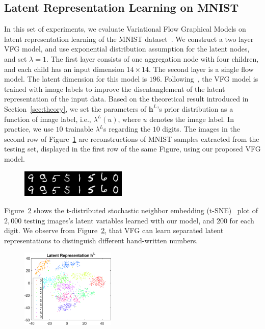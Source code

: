 \documentclass[twoside]{article}
\begin{document}
\subsection{Latent Representation Learning on MNIST}
\vspace{-0.05in}
In this set of experiments, we evaluate  Variational Flow Graphical Models on latent representation learning of the MNIST dataset~\cite{lecun-mnisthandwrittendigit-2010}. 
We construct a two layer VFG model, and use exponential distribution assumption for the latent nodes, and set $\lambda=1$. 
The first layer consists of one aggregation node with four children, and each child has an input dimension $14\times 14$. 
The second layer is a single flow model.
The latent dimension for this model is $196$. 
Following~\cite{Sorrenson2020}, the VFG model is trained with image labels to improve the disentanglement of the latent representation of the input data. 
Based on the theoretical result introduced in Section~\ref{sec:theory}, we set the parameters of $\mathbf{h}^L$'s prior distribution as a function of image label, i.e., $\lambda^L(u)$, where $u$ denotes the image label. 
In practice, we use $10$ trainable $\lambda^L$s regarding the $10$ digits. 
The images in the second row of Figure~\ref{fig:reconst} are reconstructions of MNIST samples extracted from the testing set, displayed in the first row of the same Figure, using our proposed VFG model.  
\begin{figure}[H]
    \centering
       \includegraphics[width=0.45\textwidth]{fig/reconst_Y.png}
    \label{fig:reconst}
\end{figure}
Figure~\ref{fig:z_tsne} shows the t-distributed stochastic neighbor embedding (t-SNE)~\cite{maaten2008visualizing} plot of $2,000$ testing images's latent variables  learned with our model, and $200$ for each digit. 
We observe from Figure~\ref{fig:z_tsne}, that VFG can learn separated latent representations to distinguish different hand-written numbers.
\vspace{-0.05in}
\begin{figure}[H]
    \centering
       \includegraphics[width=0.4\textwidth]{fig/z_Y.eps}
    \label{fig:z_tsne}
\end{figure}
\end{document}
